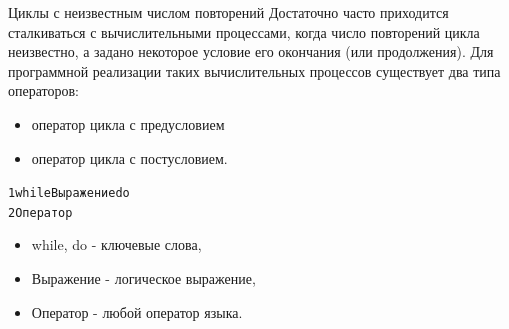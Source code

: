 \documentclass{beamer}
\begin{document}
\begin{frame}[fragile]{Циклы с неизвестным числом повторений}
Достаточно часто приходится сталкиваться с вычислительными процессами, когда число повторений цикла неизвестно, а задано некоторое условие его окончания (или продолжения). Для программной реализации таких вычислительных процессов существует два типа операторов: 
\begin{itemize}
\item оператор цикла с предусловием 
\item оператор цикла с постусловием.
\end{itemize}
\begin{alltt}
1 while Выражение do
2   Оператор
\end{alltt}
\begin{itemize}
\item while, do - ключевые слова, 
\item Выражение - логическое выражение, 
\item Оператор - любой оператор языка.
\end{itemize}
\end{frame}
\end{document}

